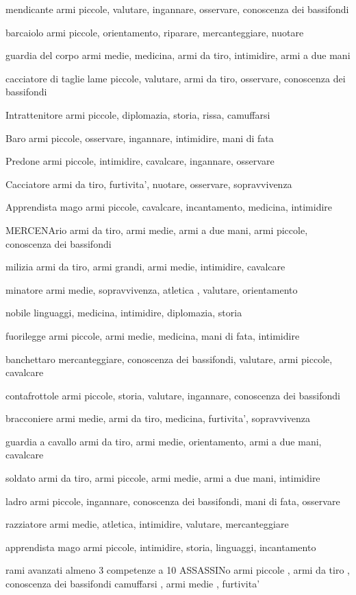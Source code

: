 \documentclass[12pt,a4paper,twoside,openany,twocolumn]{book}
\begin{document}
mendicante
armi piccole, valutare, ingannare, osservare, conoscenza dei bassifondi

barcaiolo
armi piccole, orientamento, riparare,  mercanteggiare, nuotare

guardia del corpo
armi medie, medicina, armi da tiro, intimidire, armi a due mani

cacciatore di taglie
lame piccole, valutare, armi da tiro, osservare, conoscenza dei bassifondi

Intrattenitore
armi piccole, diplomazia, storia, rissa, camuffarsi

Baro
armi piccole, osservare, ingannare, intimidire, mani di fata

Predone
armi piccole, intimidire, cavalcare, ingannare,  osservare

Cacciatore
armi da tiro, furtivita', nuotare,  osservare, sopravvivenza

Apprendista mago
armi piccole, cavalcare, incantamento, medicina, intimidire

MERCENArio
armi da tiro, armi medie, armi a due mani, armi piccole, conoscenza dei bassifondi

milizia
armi da tiro, armi grandi, armi medie, intimidire, cavalcare

minatore
armi medie, sopravvivenza, atletica , valutare, orientamento

nobile
linguaggi, medicina, intimidire,  diplomazia, storia

fuorilegge
armi piccole, armi medie, medicina, mani di fata, intimidire

banchettaro
mercanteggiare, conoscenza dei bassifondi, valutare, armi piccole, cavalcare

contafrottole
armi piccole, storia, valutare, ingannare, conoscenza dei bassifondi

bracconiere
armi medie, armi da tiro, medicina, furtivita', sopravvivenza

guardia a cavallo
armi da tiro, armi medie, orientamento, armi a due mani, cavalcare

soldato
armi da tiro, armi piccole, armi medie, armi a due mani, intimidire

ladro
armi piccole, ingannare, conoscenza dei bassifondi, mani di fata, osservare

razziatore
armi medie, atletica, intimidire, valutare,  mercanteggiare

apprendista mago
armi piccole, intimidire,  storia, linguaggi, incantamento


rami avanzati almeno 3 competenze a 10
ASSASSINo
armi piccole , armi da tiro , conoscenza dei bassifondi  camuffarsi , armi medie , furtivita' 
\end{document}

